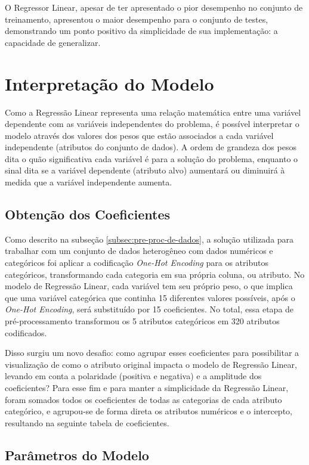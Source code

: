 \documentclass{report}
\let\oldsection\section
\renewcommand\section{\clearpage\oldsection}
\begin{document}
O Regressor Linear, apesar de ter apresentado o pior desempenho
no conjunto de treinamento, apresentou o maior desempenho para o conjunto de testes, demonstrando um ponto positivo da simplicidade de sua implementação: a capacidade de generalizar.

\section{Interpretação do Modelo}

Como a Regressão Linear representa uma relação matemática entre uma variável dependente com as variáveis independentes do problema, é possível interpretar o modelo através dos valores dos pesos
que estão associados a cada variável independente (atributos do conjunto de dados). A ordem de grandeza dos pesos dita o quão significativa cada variável é para a solução do problema, enquanto o
sinal dita se a variável dependente (atributo alvo) aumentará ou diminuirá à medida que a variável independente aumenta.

\subsection{Obtenção dos Coeficientes}

Como descrito na subseção \ref{subsec:pre-proc-de-dados}, a solução utilizada para trabalhar com um conjunto de dados heterogêneo com dados numéricos e categóricos foi aplicar a codificação \textit{One-Hot Encoding}
para os atributos categóricos, transformando cada categoria em sua própria coluna, ou atributo. No modelo de Regressão Linear, cada variável tem seu próprio peso, o que implica que uma variável categórica que continha
15 diferentes valores possíveis, após o \textit{One-Hot Encoding}, será substituído por 15 coeficientes. No total, essa etapa de pré-processamento transformou os 5 atributos categóricos em 320 atributos codificados.

Disso surgiu um novo desafio: como agrupar esses coeficientes para possibilitar a visualização de como o atributo original impacta o modelo de Regressão Linear, levando em conta a polaridade (positiva e negativa) e a amplitude
dos coeficientes? Para esse fim e para manter a simplicidade da Regressão Linear, foram somados todos os coeficientes de todas as categorias de cada atributo categórico, e agrupou-se de forma direta os atributos numéricos e o intercepto,
resultando na seguinte tabela de coeficientes.

\subsection{Parâmetros do Modelo}
\end{document}
